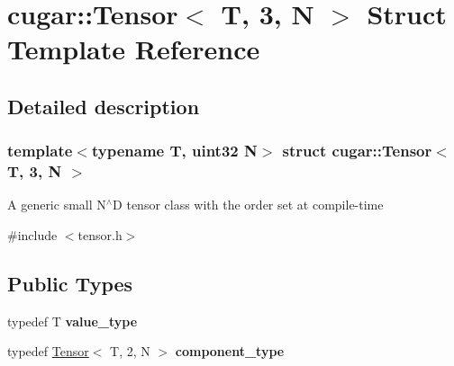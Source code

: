 \hypertarget{structcugar_1_1_tensor_3_01_t_00_013_00_01_n_01_4}{}\section{cugar\+:\+:Tensor$<$ T, 3, N $>$ Struct Template Reference}
\label{structcugar_1_1_tensor_3_01_t_00_013_00_01_n_01_4}


\subsection{Detailed description}
\subsubsection*{template$<$typename T, uint32 N$>$\newline
struct cugar\+::\+Tensor$<$ T, 3, N $>$}

A generic small N$^\wedge$D tensor class with the order set at compile-\/time 

{\ttfamily \#include $<$tensor.\+h$>$}

\subsection*{Public Types}
\begin{DoxyCompactItemize}
\item 
\mbox{\label{structcugar_1_1_tensor_3_01_t_00_013_00_01_n_01_4_af71dfffb2dfad8421203fd70bc900f0c}} 
typedef T {\bfseries value\+\_\+type}
\item 
\mbox{\label{structcugar_1_1_tensor_3_01_t_00_013_00_01_n_01_4_a79bf18d7ee86a14504ca7db9b360405f}} 
typedef \hyperlink{structcugar_1_1_tensor}{Tensor}$<$ T, 2, N $>$ {\bfseries component\+\_\+type}
\end{DoxyCompactItemize}
